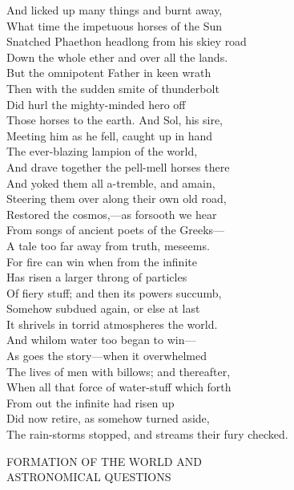 And licked up many things and burnt away,\\
What time the impetuous horses of the Sun\\
Snatched Phaethon headlong from his skiey road\\
Down the whole ether and over all the lands.\\
But the omnipotent Father in keen wrath\\
Then with the sudden smite of thunderbolt\\
Did hurl the mighty-minded hero off\\
Those horses to the earth. And Sol, his sire,\\
Meeting him as he fell, caught up in hand\\
The ever-blazing lampion of the world,\\
And drave together the pell-mell horses there\\
And yoked them all a-tremble, and amain,\\
Steering them over along their own old road,\\
Restored the cosmos,—as forsooth we hear\\
From songs of ancient poets of the Greeks—\\
A tale too far away from truth, meseems.\\
For fire can win when from the infinite\\
Has risen a larger throng of particles\\
Of fiery stuff; and then its powers succumb,\\
Somehow subdued again, or else at last\\
It shrivels in torrid atmospheres the world.\\
And whilom water too began to win—\\
As goes the story—when it overwhelmed\\
The lives of men with billows; and thereafter,\\
When all that force of water-stuff which forth\\
From out the infinite had risen up\\
Did now retire, as somehow turned aside,\\
The rain-storms stopped, and streams their fury checked.

FORMATION OF THE WORLD AND\\
ASTRONOMICAL QUESTIONS

